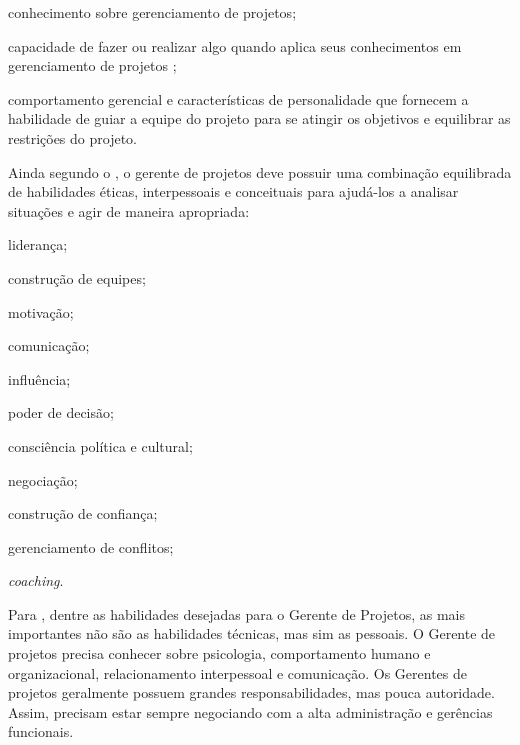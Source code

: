 \documentclass[
    12pt,               %
    openright,          %
    twoside,            %
    a4paper,            %
    chapter=TITLE,     %
    english,            %
    spanish,            %
    portuguese              %
    ]{abntex2}
\begin{document}
\begin{alineas}
	\item conhecimento sobre gerenciamento de projetos;
	\item capacidade de fazer ou realizar algo quando aplica seus conhecimentos em gerenciamento de projetos ;
	\item comportamento gerencial e características de personalidade que fornecem a habilidade de guiar a equipe do projeto para se atingir os objetivos e equilibrar as restrições do projeto.
\end{alineas}

Ainda segundo o , o gerente de projetos deve possuir uma combinação equilibrada de habilidades éticas, interpessoais e conceituais para ajudá-los a analisar situações e agir de maneira apropriada:

\begin{alineas}
	\item liderança;
	\item construção de equipes;
	\item motivação;
	\item comunicação;
	\item influência;
	\item poder de decisão;
	\item consciência política e cultural;
	\item negociação;
	\item construção de confiança;
	\item gerenciamento de conflitos;
	\item \textit{coaching}.
\end{alineas}

Para , dentre as habilidades desejadas para o Gerente de Projetos, as mais importantes não são as habilidades técnicas, mas sim as pessoais. O Gerente de projetos precisa conhecer sobre psicologia, comportamento humano e organizacional, relacionamento interpessoal e comunicação. Os Gerentes de projetos geralmente possuem grandes responsabilidades, mas pouca autoridade. Assim, precisam estar sempre negociando com a alta administração e gerências funcionais.
\end{document}
